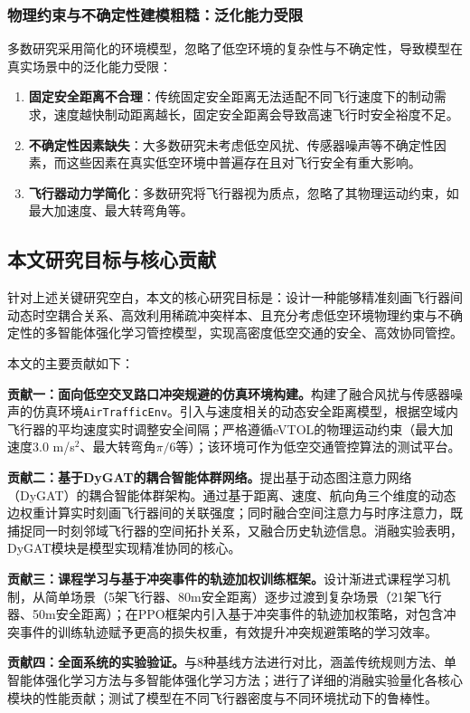 \documentclass[12pt,a4paper,UTF8]{ctexart}
\begin{document}
\subsubsection{物理约束与不确定性建模粗糙：泛化能力受限}
多数研究采用简化的环境模型，忽略了低空环境的复杂性与不确定性，导致模型在真实场景中的泛化能力受限：
\begin{enumerate}[label=(\arabic*)]
    \item \textbf{固定安全距离不合理}：传统固定安全距离无法适配不同飞行速度下的制动需求，速度越快制动距离越长，固定安全距离会导致高速飞行时安全裕度不足\cite{ref16}。
    \item \textbf{不确定性因素缺失}：大多数研究未考虑低空风扰、传感器噪声等不确定性因素，而这些因素在真实低空环境中普遍存在且对飞行安全有重大影响。
    \item \textbf{飞行器动力学简化}：多数研究将飞行器视为质点，忽略了其物理运动约束，如最大加速度、最大转弯角等。
\end{enumerate}

\subsection{本文研究目标与核心贡献}
针对上述关键研究空白，本文的核心研究目标是：设计一种能够精准刻画飞行器间动态时空耦合关系、高效利用稀疏冲突样本、且充分考虑低空环境物理约束与不确定性的多智能体强化学习管控模型，实现高密度低空交通的安全、高效协同管控。

本文的主要贡献如下：

\textbf{贡献一：面向低空交叉路口冲突规避的仿真环境构建。}构建了融合风扰与传感器噪声的仿真环境\texttt{AirTrafficEnv}。引入与速度相关的动态安全距离模型，根据空域内飞行器的平均速度实时调整安全间隔；严格遵循eVTOL的物理运动约束（最大加速度3.0 m/s$^2$、最大转弯角$\pi/6$等）；该环境可作为低空交通管控算法的测试平台。

\textbf{贡献二：基于DyGAT的耦合智能体群网络。}提出基于动态图注意力网络（DyGAT）的耦合智能体群架构。通过基于距离、速度、航向角三个维度的动态边权重计算实时刻画飞行器间的关联强度；同时融合空间注意力与时序注意力，既捕捉同一时刻邻域飞行器的空间拓扑关系，又融合历史轨迹信息。消融实验表明，DyGAT模块是模型实现精准协同的核心。

\textbf{贡献三：课程学习与基于冲突事件的轨迹加权训练框架。}设计渐进式课程学习机制，从简单场景（5架飞行器、80m安全距离）逐步过渡到复杂场景（21架飞行器、50m安全距离）；在PPO框架内引入基于冲突事件的轨迹加权策略，对包含冲突事件的训练轨迹赋予更高的损失权重，有效提升冲突规避策略的学习效率。

\textbf{贡献四：全面系统的实验验证。}与8种基线方法进行对比，涵盖传统规则方法、单智能体强化学习方法与多智能体强化学习方法；进行了详细的消融实验量化各核心模块的性能贡献；测试了模型在不同飞行器密度与不同环境扰动下的鲁棒性。
\end{document}
